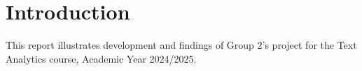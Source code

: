 \chapter*{Introduction}
\label{ch:Introduction}
This report illustrates development and findings of Group 2's project for
the Text Analytics course, Academic Year 2024/2025. \\




